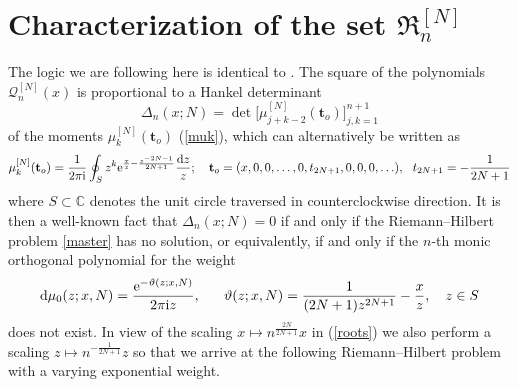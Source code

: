 \documentclass[10pt,reqno,oneside]{amsart}
\renewcommand{\d}{{\mathrm d}}
\newcommand{\im}{\mathrm{i}}
\numberwithin{equation}{section}
\newtheorem{theo}{Theorem}[section]
\def\bt{\begin{theo}}
\def\be{\begin{equation}}
\def\ee{\end{equation}}
\def\Roots{\mathfrak R}
\def\eqref#1{(\ref{#1})}
\def\bt{{\mathbf t}}
\begin{document}
\section{Characterization of the set $\Roots_n^{[N]}$}\label{character}
%
%
The logic we are following here is identical to \cite{BB}. The square of the polynomials $\mathcal{Q}_n^{[N]}(x)$ is proportional to a Hankel determinant 
\begin{equation*}
	\Delta_{n}(x;N) = \det\big[\mu_{j+k-2}^{[N]}(\bt_o)\big]_{j,k=1}^{n+1}
\end{equation*}
of the moments $\mu_k^{[N]}(\bt_o)$ \eqref{muk}, which can alternatively be written as 
\be
	\mu_k^{[N]}(\bt_o) = \frac{1}{2\pi\im}\oint_{S}z^k{\rm e}^{\frac{x}{z}-\frac{z^{-2N-1}}{2N+1}} \frac{\d z}{z};\ \ \ \bt_o=(x,0,0,\ldots,0,t_{2N+1},0,0,0,\ldots),\ \ t_{2N+1}=-\frac{1}{2N+1}
\ee
where $S\subset\mathbb{C}$ denotes the unit circle traversed in counterclockwise direction. It is then a well-known fact that $\Delta_{n}(x;N)=0$ if and only if the Riemann--Hilbert problem \ref{master} has no solution, or equivalently, if and only if the $n$-th monic orthogonal polynomial for the weight 
\begin{equation*}
	\d\mu_0 (z;x,N)= \frac { {\rm e}^{-\vartheta(z;x,N)} }{2\pi\im z},\ \ \ \ \ \vartheta(z;x,N) = \frac 1{(2N+1)z^{2N+1}}-\frac{x}{z},\ \ \ z\in S
\end{equation*}
does not exist.
%
In view of the scaling $x\mapsto n^{\frac {2N}{2N+1}}x$ in \eqref{roots} we also perform a scaling $z\mapsto n^{-\frac 1{2N+1}}z$ so that we arrive at the following Riemann--Hilbert problem with a varying exponential weight.
\end{document}
